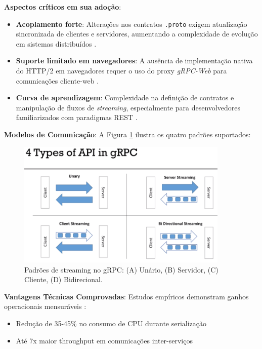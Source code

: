 \textbf{Aspectos críticos em sua adoção}:
\begin{itemize}
\item \textbf{Acoplamento forte}: Alterações nos contratos \texttt{.proto} exigem atualização sincronizada de clientes e servidores, aumentando a complexidade de evolução em sistemas distribuídos \cite{ibm:7}.
\item \textbf{Suporte limitado em navegadores}: A ausência de implementação nativa do HTTP/2 em navegadores requer o uso do proxy \textit{gRPC-Web} para comunicações cliente-web \cite{wallarm:4}.
\item \textbf{Curva de aprendizagem}: Complexidade na definição de contratos e manipulação de fluxos de \textit{streaming}, especialmente para desenvolvedores familiarizados com paradigmas REST \cite{marutitech:9}.
\end{itemize}

\textbf{Modelos de Comunicação}:
A Figura \ref{fig:grpc_streaming} ilustra os quatro padrões suportados:

\begin{figure}[H]
\centering
\includegraphics[width=0.9\textwidth]{images/grpc.png}
\caption{Padrões de streaming no gRPC: (A) Unário, (B) Servidor, (C) Cliente, (D) Bidirecional.}
\label{fig:grpc_streaming}
\end{figure}

\textbf{Vantagens Técnicas Comprovadas}:
Estudos empíricos demonstram ganhos operacionais mensuráveis \cite{niswar2023performance}:
\begin{itemize}
\item Redução de 35-45\% no consumo de CPU durante serialização
\item Até 7x maior throughput em comunicações inter-serviços
\end{itemize}


